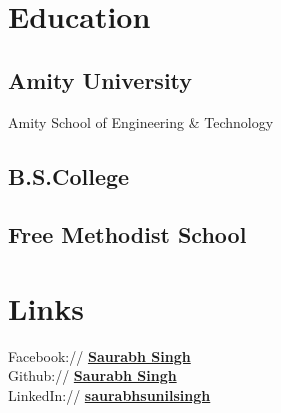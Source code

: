 \documentclass[]{deedy-resume-openfont}
\begin{document}
%
%
\lastupdated

%
%

%
%

\begin{minipage}[t]{0.33\textwidth} 


\section{Education} 



\subsection{Amity University}
Amity School of Engineering \& Technology\\
\sectionsep

\subsection{B.S.College}
\sectionsep

\subsection{Free Methodist School}
\sectionsep


\section{Links} 
Facebook:// \href{https://www.facebook.com/saurabhsunilsingh/}{\bf Saurabh Singh} \\
Github:// \href{https://github.com/saurabhsunilsingh}{\bf Saurabh Singh} \\
LinkedIn://  \href{https://www.linkedin.com/in/saurabhsunilsingh/}{\bf saurabhsunilsingh} 



\end{minipage}
\end{document}
